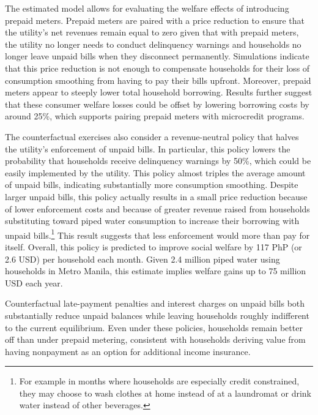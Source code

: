 \documentclass[12pt]{article}
\begin{document}
The estimated model allows for evaluating the welfare effects of introducing prepaid meters.  Prepaid meters are paired with a price reduction to ensure that the utility's net revenues remain equal to zero given that with prepaid meters, the utility no longer needs to conduct delinquency warnings and households no longer leave unpaid bills when they disconnect permanently.  Simulations indicate that this price reduction is not enough to compensate households for their loss of consumption smoothing from having to pay their bills upfront.  Moreover, prepaid meters appear to steeply lower total household borrowing.  Results further suggest that these consumer welfare losses could be offset by lowering borrowing costs by around 25\%, which supports pairing prepaid meters with microcredit programs.

The counterfactual exercises also consider a revenue-neutral policy that halves the utility's enforcement of unpaid bills.  In particular, this policy lowers the probability that households receive delinquency warnings by 50\%, which could be easily implemented by the utility.  This policy almost triples the average amount of unpaid bills, indicating substantially more consumption smoothing.  Despite larger unpaid bills, this policy actually results in a small price reduction because of lower enforcement costs and because of greater revenue raised from households substituting toward piped water consumption to increase their borrowing with unpaid bills.\footnote{For example in months where households are especially credit constrained, they may choose to wash clothes at home instead of at a laundromat or drink water instead of other beverages.}  This result suggests that less enforcement would more than pay for itself.  Overall, this policy is predicted to improve social welfare by 117 PhP (or 2.6 USD) per household each month.  Given 2.4 million piped water using households in Metro Manila, this estimate implies welfare gains up to 75 million USD each year.

Counterfactual late-payment penalties and interest charges on unpaid bills both substantially reduce unpaid balances while leaving households roughly indifferent to the current equilibrium.  Even under these policies, households remain better off than under prepaid metering, consistent with households deriving value from having nonpayment as an option for additional income insurance.
\end{document}
